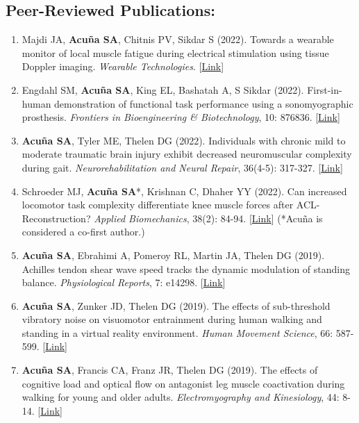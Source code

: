 \documentclass[letterpaper, 10pt]{article}
\begin{document}
\subsection{Peer-Reviewed Publications:}
\begin{enumerate}
    \item Majdi JA, \textbf{Acuña SA}, Chitnis PV, Sikdar S (2022). Towards a wearable monitor of local muscle fatigue during electrical stimulation using tissue Doppler imaging. \textit{Wearable Technologies}. [\href{https://www.cambridge.org/core/journals/wearable-technologies/article/toward-a-wearable-monitor-of-local-muscle-fatigue-during-electrical-muscle-stimulation-using-tissue-doppler-imaging/4ADA49B3A98D245E222D5CCFDE1F180D}{Link}]
    \item Engdahl SM, \textbf{Acuña SA}, King EL, Bashatah A, S Sikdar (2022). First-in-human demonstration of functional task performance using a sonomyographic prosthesis. \textit{Frontiers in Bioengineering \& Biotechnology}, 10: 876836. [\href{https://www.frontiersin.org/articles/10.3389/fbioe.2022.876836/full}{Link}]
    \item \textbf{Acuña SA}, Tyler ME, Thelen DG (2022). Individuals with chronic mild to moderate traumatic brain injury exhibit decreased neuromuscular complexity during gait. \textit{Neurorehabilitation and Neural Repair}, 36(4-5): 317-327. [\href{https://journals.sagepub.com/doi/full/10.1177/15459683221081064}{Link}]
    \item Schroeder MJ, \textbf{Acuña SA}*, Krishnan C, Dhaher YY (2022). Can increased locomotor task complexity differentiate knee muscle forces after ACL-Reconstruction? \textit{Applied Biomechanics}, 38(2): 84-94. [\href{https://journals.humankinetics.com/view/journals/jab/38/2/article-p84.xml}{Link}] (*Acuña is considered a co-ﬁrst author.)
    \item \textbf{Acuña SA}, Ebrahimi A, Pomeroy RL, Martin JA, Thelen DG (2019). Achilles tendon shear wave speed tracks the dynamic modulation of standing balance. \textit{Physiological Reports}, 7: e14298. [\href{https://physoc.onlinelibrary.wiley.com/doi/full/10.14814/phy2.14298}{Link}]
    \item \textbf{Acuña SA}, Zunker JD, Thelen DG (2019). The effects of sub-threshold vibratory noise on visuomotor entrainment during human walking and standing in a virtual reality environment. \textit{Human Movement Science}, 66: 587-599. [\href{https://www.sciencedirect.com/science/article/abs/pii/S0167945719300582}{Link}]
    \item \textbf{Acuña SA}, Francis CA, Franz JR, Thelen DG (2019). The effects of cognitive load and optical ﬂow on antagonist leg muscle coactivation during walking for young and older adults. \textit{Electromyography and Kinesiology}, 44: 8-14. [\href{https://www.sciencedirect.com/science/article/abs/pii/S1050641118303122}{Link}]

\end{enumerate}
\end{document}
